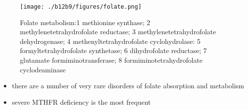 \documentclass{scrartcl}
\begin{document}
\begin{figure}[htbp]
\centering
\texttt{[image: ./b12b9/figures/folate.png]}
\caption{\label{fig:org863f1a3}
Folate metabolism:1 methionine synthase; 2 methylenetetrahydrofolate reductase; 3 methylenetetrahydrofolate dehydrogenase; 4 methenyltetrahydrofolate cyclohydrolase: 5 formyltetrahydrofolate synthetase; 6 dihydrofolate reductase; 7 glutamate formiminotransferase; 8 formiminotetrahydrofolate cyclodeaminase}
\end{figure}

\begin{itemize}
\item there are a number of very rare disorders of folate absorption and metabolism
\item severe MTHFR deficiency is the most frequent
\end{itemize}
\end{document}
